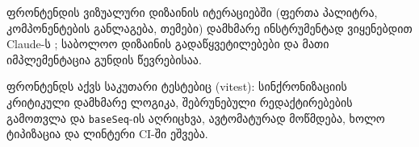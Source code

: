 ფრონტენდის ვიზუალური დიზაინის იტერაციებში (ფერთა პალიტრა, კომპონენტების
განლაგება, თემები) დამხმარე ინსტრუმენტად ვიყენებდით Claude-ს
\cite{claude}; საბოლოო დიზაინის გადაწყვეტილებები და მათი იმპლემენტაცია
გუნდის წევრებისაა.

ფრონტენდს აქვს საკუთარი ტესტებიც (vitest): სინქრონიზაციის კრიტიკული
დამხმარე ლოგიკა, შებრუნებული რედაქტირებების გამოთვლა და
\texttt{baseSeq}-ის აღრიცხვა, ავტომატურად მოწმდება, ხოლო ტიპიზაცია და
ლინტერი CI-ში ეშვება.
